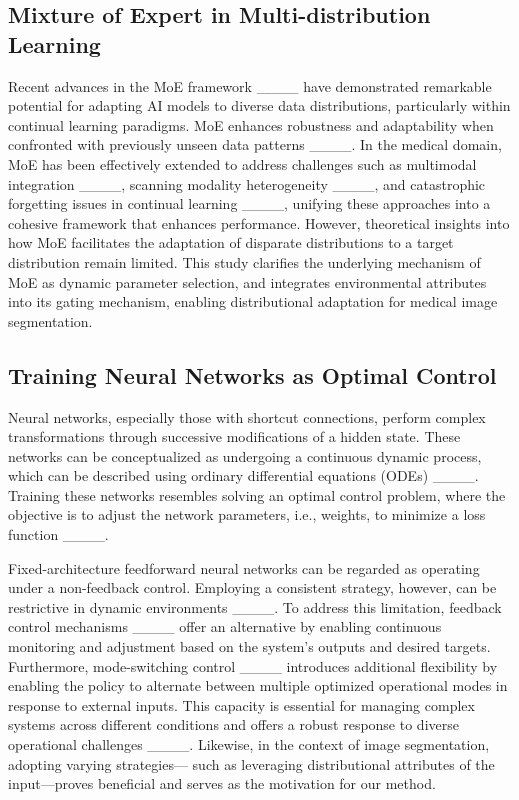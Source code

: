 \subsection{Mixture of Expert in Multi-distribution Learning}
Recent advances in the MoE framework ____ have demonstrated remarkable potential for adapting AI models to diverse data distributions, particularly within continual learning paradigms. MoE enhances robustness and adaptability when confronted with previously unseen data patterns ____. In the medical domain, MoE has been effectively extended to address challenges such as multimodal integration ____, scanning modality heterogeneity ____, and catastrophic forgetting issues in continual learning ____, unifying these approaches into a cohesive framework that enhances performance. However, theoretical insights into how MoE facilitates the adaptation of disparate distributions to a target distribution remain limited. {This study clarifies the underlying mechanism of MoE as dynamic parameter selection,  and integrates environmental attributes into its gating mechanism, enabling distributional adaptation for medical image segmentation. }

\subsection{Training Neural Networks as Optimal Control}
Neural networks, especially those with shortcut connections, perform complex transformations through successive modifications of a hidden state. These networks can be conceptualized as undergoing a continuous dynamic process, which can be described using ordinary differential equations (ODEs) ____. Training these networks resembles solving an optimal control problem, where the objective is to adjust the network parameters, i.e., weights, to minimize a loss function ____. %

{Fixed-architecture feedforward neural networks can be regarded as operating under a non-feedback control. Employing a consistent strategy, however, can be restrictive in dynamic environments ____.}
To address this limitation, feedback control mechanisms ____ offer an alternative by enabling continuous monitoring and adjustment based on the system's outputs and desired targets.
Furthermore, mode-switching control ____ introduces additional flexibility by enabling the policy to alternate between multiple optimized operational modes in response to external inputs. This capacity is essential for managing complex systems across different conditions and offers a robust response to diverse operational challenges ____. %
Likewise, in the context of image segmentation, adopting varying strategies— such as leveraging distributional attributes of the input—proves beneficial and serves as the motivation for our method.





